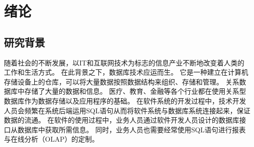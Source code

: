 




\chapter{绪论}
\label{chap:intro}
\section{研究背景}
\label{intro:background}
随着社会的不断发展，以IT和互联网技术为标志的信息产业不断地改变着人类的工作和生活方式。
在此背景之下，数据库技术应运而生。
它是一种建立在计算机存储设备上的仓库，可以将大量数据按照数据结构来组织、存储和管理。
关系数据库中存储了大量的数据和信息。
医疗、教育、金融等各个行业都在使用关系型数据库作为数据存储以及应用程序的基础。
在软件系统的开发过程中，技术开发人员会频繁在系统后端运用SQL语句从而将软件系统与数据库系统连接起来，保证数据的流通。
在软件的使用过程中，业务人员通过软件开发人员设计的数据库接口从数据库中获取所需信息。
同时，业务人员也需要经常使用SQL语句进行报表与在线分析（OLAP）的定制。

